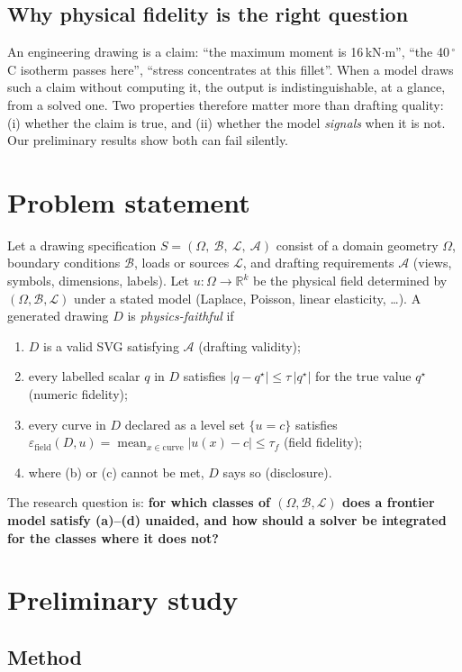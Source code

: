 \documentclass[11pt,a4paper]{article}
\newcommand{\eps}{\varepsilon_{\mathrm{field}}}
\begin{document}
\subsection{Why physical fidelity is the right question}
An engineering drawing is a claim: ``the maximum moment is 16\,kN$\cdot$m'', ``the 40\,$^{\circ}$C isotherm passes here'', ``stress concentrates at this fillet''. When a model draws such a claim without computing it, the output is indistinguishable, at a glance, from a solved one. Two properties therefore matter more than drafting quality: (i) whether the claim is true, and (ii) whether the model \emph{signals} when it is not. Our preliminary results show both can fail silently.

\section{Problem statement}
Let a drawing specification $S=(\Omega,\ \mathcal{B},\ \mathcal{L},\ \mathcal{A})$ consist of a domain geometry $\Omega$, boundary conditions $\mathcal{B}$, loads or sources $\mathcal{L}$, and drafting requirements $\mathcal{A}$ (views, symbols, dimensions, labels). Let $u:\Omega\to\mathbb{R}^k$ be the physical field determined by $(\Omega,\mathcal{B},\mathcal{L})$ under a stated model (Laplace, Poisson, linear elasticity, \ldots). A generated drawing $D$ is \emph{physics-faithful} if
\begin{enumerate}[label=(\alph*),leftmargin=2em]
  \item $D$ is a valid SVG satisfying $\mathcal{A}$ (drafting validity);
  \item every labelled scalar $q$ in $D$ satisfies $|q-q^\star|\le \tau\,|q^\star|$ for the true value $q^\star$ (numeric fidelity);
  \item every curve in $D$ declared as a level set $\{u=c\}$ satisfies $\eps(D,u)=\operatorname{mean}_{x\in\text{curve}}|u(x)-c|\le\tau_f$ (field fidelity);
  \item where (b) or (c) cannot be met, $D$ says so (disclosure).
\end{enumerate}
The research question is: \textbf{for which classes of $(\Omega,\mathcal{B},\mathcal{L})$ does a frontier model satisfy (a)--(d) unaided, and how should a solver be integrated for the classes where it does not?}

\section{Preliminary study}
\subsection{Method}
\begingroup\sloppy
\end{document}
